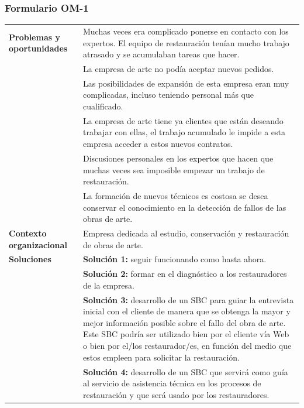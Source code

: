 \documentclass[a4paper,11pt]{article}
\begin{document}
			\subsubsection{Formulario OM-1}
			\begin{center}
				\begin{tabular}{| p{2.9cm} | p{8.5cm} |}
					\hline
					\cellcolor[RGB]{224,233,250}\textbf{Problemas y oportunidades} &
					Muchas veces era complicado ponerse en contacto con los expertos. El equipo
					de restauración tenían mucho trabajo atrasado y se acumulaban tareas que hacer.\\
					\cellcolor[RGB]{224,233,250}& La empresa de arte no podía aceptar nuevos
					pedidos.\\
					\cellcolor[RGB]{224,233,250}& Las posibilidades de expansión de esta
					empresa eran muy complicadas, incluso teniendo personal más que cualificado.\\
					\cellcolor[RGB]{224,233,250}& La empresa de arte tiene ya clientes que
					están deseando trabajar con ellas, el trabajo acumulado le impide a esta empresa acceder a estos nuevos
					contratos.\\
					\cellcolor[RGB]{224,233,250}& Discusiones personales en los expertos que
					hacen que muchas veces sea imposible empezar un trabajo de restauración.\\
					\cellcolor[RGB]{224,233,250}& La formación de nuevos técnicos es costosa se
					desea conservar el conocimiento en la detección de fallos de las obras de arte.\\
					\hline
					\cellcolor[RGB]{224,233,250}\textbf{Contexto organizacional} &
					Empresa dedicada al estudio, conservación y restauración de obras de arte.\\
					\hline
					\cellcolor[RGB]{224,233,250}\textbf{Soluciones} & \textbf{Solución 1:}
					seguir funcionando como hasta ahora.\\
					\cellcolor[RGB]{224,233,250}& \textbf{Solución 2:} formar en el diagnóstico
					a los restauradores de la empresa.\\
					\cellcolor[RGB]{224,233,250}& \textbf{Solución 3:} desarrollo de un SBC
					para guiar la entrevista inicial con el cliente de manera que se obtenga la mayor y mejor información posible sobre el fallo del obra de arte. Este SBC podría ser utilizado bien por el cliente vía Web o bien por el/los restaurador/es, en función del medio que estos empleen para solicitar la restauración.\\
					\cellcolor[RGB]{224,233,250}& \textbf{Solución 4:} desarrollo de un SBC que
					servirá como guía al servicio de asistencia técnica en los procesos de restauración y que será usado por los restauradores.\\
					\hline
				\end{tabular}
			\end{center}
			\newpage
\end{document}
